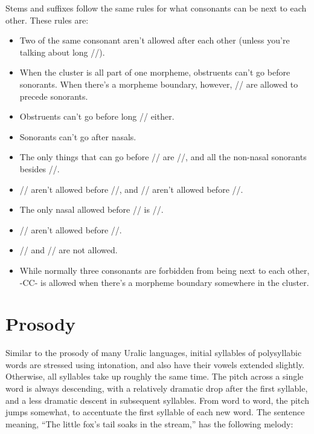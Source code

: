 Stems and suffixes follow the same rules for what consonants can be next to
each other. These rules are:
\begin{itemize}
  \item Two of the same consonant aren't allowed after each other (unless you're
    talking about long //).
  \item When the cluster is all part of one morpheme, obstruents can't go before
    sonorants. When there's a morpheme boundary, however, // are
    allowed to precede sonorants.
  \item Obstruents can't go before long // either.
  \item Sonorants can't go after nasals.
  \item The only things that can go before // are //, and all the
    non-nasal sonorants besides //.
  \item // aren't allowed before //, and // aren't
    allowed before //.
  \item The only nasal allowed before // is //.
  \item // aren't allowed before //.
  \item // and // are not allowed.
  \item While normally three consonants are forbidden from being next to each
    other, -CC- is allowed when there's a morpheme boundary somewhere in
    the cluster.
\end{itemize}

\section{Prosody}
Similar to the prosody of many Uralic languages, initial syllables of
polysyllabic words are stressed using intonation, and also have their vowels
extended slightly. Otherwise, all syllables take up roughly the same time. The
pitch across a single word is always descending, with a relatively dramatic drop
after the first syllable, and a less dramatic descent in subsequent syllables.
From word to word, the pitch jumps somewhat, to accentuate the first syllable of
each new word. The sentence 
meaning, ``The little fox's tail soaks in the stream,'' has the following
melody:

\begin{center}
\end{center}\vspace{-1em}

